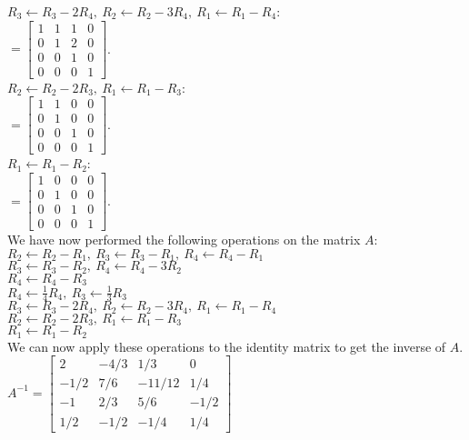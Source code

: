\documentclass[a4paper]{article}
\begin{document}
\begin{enumerate}
$R_3 \leftarrow R_3 - 2R_4,\ R_2 \leftarrow R_2 - 3R_4,\ R_1 \leftarrow R_1 - R_4$:\\
$= \begin{bmatrix}1 & 1 & 1 & 0\\0 & 1 & 2 & 0\\0 & 0 & 1 & 0\\0 & 0 & 0 & 1\end{bmatrix}$.\\

$R_2 \leftarrow R_2 - 2R_3,\ R_1 \leftarrow R_1 - R_3$:\\
$= \begin{bmatrix}1 & 1 & 0 & 0\\0 & 1 & 0 & 0\\0 & 0 & 1 & 0\\0 & 0 & 0 & 1\end{bmatrix}$.\\

$R_1 \leftarrow R_1 - R_2$:\\
$= \begin{bmatrix}1 & 0 & 0 & 0\\0 & 1 & 0 & 0\\0 & 0 & 1 & 0\\0 & 0 & 0 & 1\end{bmatrix}$.\\


We have now performed the following operations on the matrix $A$:\\
$R_2 \leftarrow R_2 - R_1,\ R_3 \leftarrow R_3 - R_1,\ R_4 \leftarrow R_4 - R_1$\\
$R_3 \leftarrow R_3 - R_2,\ R_4 \leftarrow R_4 - 3R_2$\\
$R_4 \leftarrow R_4 - R_3$\\
$R_4 \leftarrow \frac{1}{4} R_4,\ R_3 \leftarrow \frac{1}{3} R_3$\\
$R_3 \leftarrow R_3 - 2R_4,\ R_2 \leftarrow R_2 - 3R_4,\ R_1 \leftarrow R_1 - R_4$\\
$R_2 \leftarrow R_2 - 2R_3,\ R_1 \leftarrow R_1 - R_3$\\
$R_1 \leftarrow R_1 - R_2$\\

We can now apply these operations to the identity matrix to get the inverse of $A$.\\

$A^{-1} =
\begin{bmatrix}
    2 & -4/3 & 1/3 & 0\\
    -1/2 & 7/6 & -11/12 & 1/4\\
    -1 & 2/3 & 5/6 & -1/2\\
    1/2 & -1/2 & -1/4 & 1/4
\end{bmatrix}$
\end{enumerate}
\end{document}
